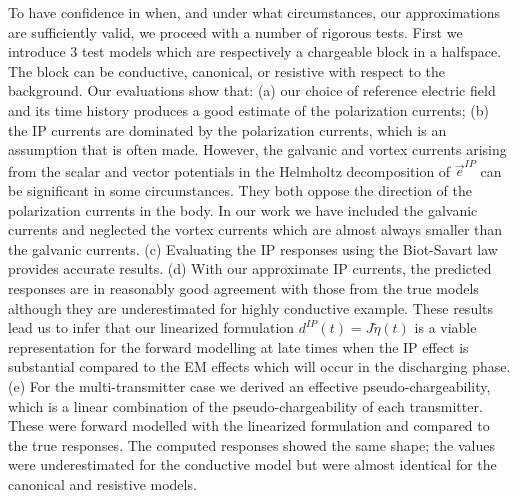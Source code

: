 \documentclass[extra,mreferee]{gji}
\newcommand {\e}  { {\vec e} }
\newcommand{\peta}{\tilde{\eta}}
\begin{document}
To have confidence in when, and under what circumstances, our approximations are sufficiently valid, we proceed with a number of rigorous tests. First we introduce 3 test models which are respectively a chargeable block in a halfspace. The block can be conductive, canonical, or resistive with respect to the background. Our evaluations show that: 
(a) our choice of reference electric field and its time history produces a good estimate of the polarization currents;
(b) the IP currents are dominated by the polarization currents, which is an assumption that is often made. However, the galvanic and vortex currents arising from the scalar and vector potentials in the Helmholtz decomposition of $\e^{IP}$ can be significant in some circumstances. They both oppose the direction of the polarization currents in the body. In our work we have included the galvanic currents and neglected the vortex currents which are almost always smaller than the galvanic currents.
(c) Evaluating the IP responses using the Biot-Savart law provides accurate results.
(d) With our approximate IP currents, the predicted responses are in reasonably good agreement with those from the true models although they are underestimated for highly conductive example. These results lead us to infer that our linearized formulation $d^{IP}(t)=J\peta(t)$ is a viable representation for the forward modelling at late times when  the IP effect is substantial compared to the EM effects which will occur in the discharging phase. 
(e) For the multi-transmitter case we derived an effective pseudo-chargeability, which is a linear combination of the pseudo-chargeability of each transmitter. These were forward modelled with the linearized formulation and compared to the true responses. The computed responses showed the same shape; the values were underestimated for the conductive model but were almost identical for the canonical and resistive models.  
\end{document}
